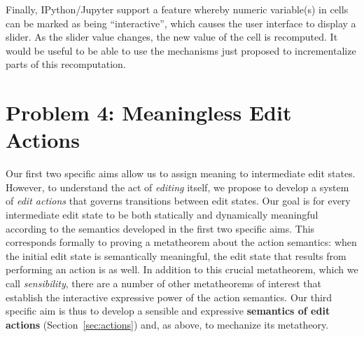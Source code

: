 \documentclass[letterpaper,USenglish]{lipics-v2016}
\begin{document}
Finally, IPython/Jupyter \cite{Perez:2007:ISI:1251563.1251831} support a feature whereby numeric variable(s) in cells can be marked as being ``interactive'', which causes the user interface to display a slider. As the slider value changes, the new value of the cell is recomputed. It would be useful to be able to use the mechanisms just proposed to incrementalize parts of this recomputation.






\section{Problem 4: Meaningless Edit Actions} Our first two specific aims
allow us to assign meaning to intermediate edit states. However, to
understand the act of \emph{editing} itself, we propose to develop a system of
\emph{edit actions} that governs transitions between edit
states. Our goal is for every intermediate edit state to be both statically and
dynamically meaningful according to the semantics developed in the first two
specific aims. This corresponds formally to proving a
metatheorem about the action semantics: when the initial edit state is
semantically meaningful, the edit state that results from performing an action
is as well. In addition to this crucial metatheorem, which
we call \emph{sensibility}, there are a number of other metatheorems of interest
that establish the interactive expressive power of the action semantics. Our third specific
aim is thus to develop a sensible and expressive \textbf{semantics of edit actions} (Section~\ref{sec:actions})
and, as above, to mechanize its metatheory.
\end{document}
